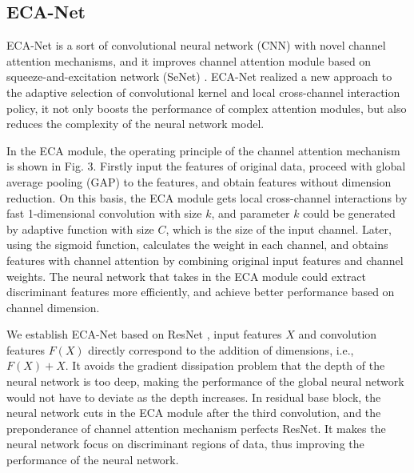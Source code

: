 \documentclass[conference]{IEEEtran}
\begin{document}
\subsection{ECA-Net}
ECA-Net is a sort of convolutional neural network (CNN) \cite{zhang2021fast} with novel channel attention mechanisms, and it improves channel attention module based on squeeze-and-excitation network (SeNet) \cite{hu2018squeeze}. ECA-Net realized a new approach to the adaptive selection of convolutional kernel and local cross-channel interaction policy, it not only boosts the performance of complex attention modules, but also reduces the complexity of the neural network model. 

In the ECA module, the operating principle of the channel attention mechanism is shown in Fig. 3. Firstly input the features of original data, proceed with global average pooling (GAP) \cite{wang2020deep} to the features, and obtain features without dimension reduction. On this basis, the ECA module gets local cross-channel interactions by fast 1-dimensional convolution with size $k$, and parameter $k$ could be generated by adaptive function with size $C$, which is the size of the input channel. Later, using the sigmoid function, calculates the weight in each channel, and obtains features with channel attention by combining original input features and channel weights. The neural network that takes in the ECA module could extract discriminant features more efficiently, and achieve better performance based on channel dimension.

We establish ECA-Net based on ResNet \cite{wen2020transfer}, input features $X$ and convolution features $F(X)$ directly correspond to the addition of dimensions, i.e., $F(X) + X$. It avoids the gradient dissipation problem that the depth of the neural network is too deep, making the performance of the global neural network would not have to deviate as the depth increases. In residual base block, the neural network cuts in the ECA module after the third convolution, and the preponderance of channel attention mechanism perfects ResNet. It makes the neural network focus on discriminant regions of data, thus improving the performance of the neural network.
\end{document}
